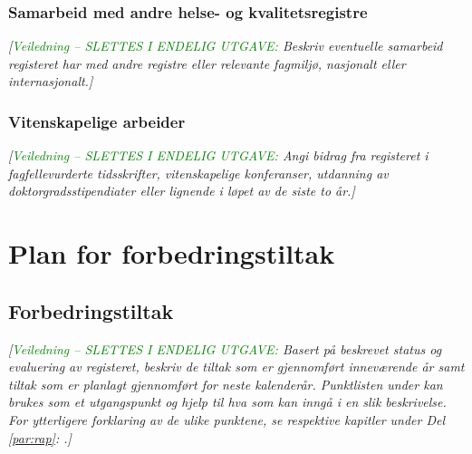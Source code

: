 \documentclass[norsk, a4paper, twocolumn]{report}
\newcommand{\newtext}[1]{\cbstart\textcolor{green}{#1\cbend}}
\newcommand{\guide}[1] {
	\textit{[\textcolor{guidegray}{\newtext{Veiledning -- SLETTES I ENDELIG
	UTGAVE:} #1}]}
	}
\begin{document}
\section{Samarbeid med andre helse- og kvalitetsregistre}\label{sec:samfag}
\guide{Beskriv eventuelle samarbeid registeret har med andre registre eller relevante fagmiljø, nasjonalt eller internasjonalt.}

\section{Vitenskapelige arbeider}\label{sec:vitarb}
\guide{Angi bidrag fra registeret i fagfellevurderte tidsskrifter,
vitenskapelige konferanser, utdanning av doktorgradsstipendiater eller
lignende i løpet av de siste to år.}




\onecolumn


\part{Plan for forbedringstiltak}\label{par:for}


\chapter{Forbedringstiltak}
\guide{Basert på beskrevet status og evaluering av registeret, beskriv de
tiltak som er gjennomført inneværende år samt tiltak som er planlagt gjennomført  for neste kalenderår.
Punktlisten under kan brukes som et utgangspunkt og hjelp til hva som kan
inngå i en slik beskrivelse. For ytterligere forklaring av de ulike punktene,
se respektive kapitler under Del \ref{par:rap}: \nameref{par:rap}.}
\end{document}
